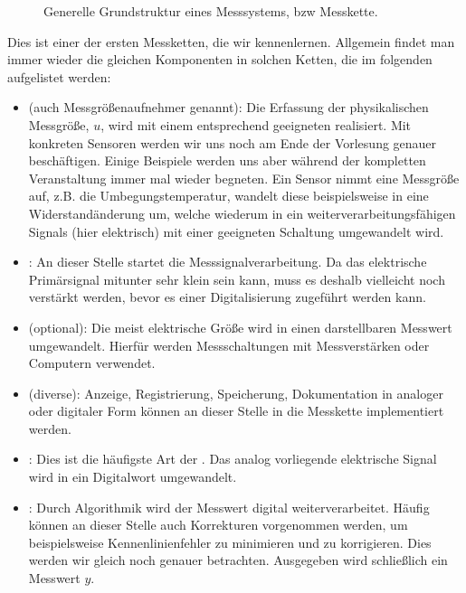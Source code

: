\documentclass[letterpaper,10pt,english]{jupyterBook}
\let\sphinxpxdimen\pdfpxdimen\else\newdimen\sphinxpxdimen
\begin{document}
\begin{figure}[htbp]
\centering
\capstart

\noindent\sphinxincludegraphics[width=800\sphinxpxdimen]{{grundstruktur}.jpg}
\caption{Generelle Grundstruktur eines Messsystems, bzw Messkette.}\label{\detokenize{content/2_Messsystem:grundstruktur}}\end{figure}

\sphinxAtStartPar
Dies ist einer der ersten Messketten, die wir kennenlernen. Allgemein findet man immer wieder die gleichen Komponenten in solchen Ketten, die im folgenden aufgelistet werden:
\begin{itemize}
\item {} 
\sphinxAtStartPar
{} (auch Messgrößenaufnehmer genannt): Die Erfassung der physikalischen Messgröße, \(u\), wird mit einem entsprechend geeigneten  realisiert. Mit konkreten Sensoren werden wir uns noch am Ende der Vorlesung genauer beschäftigen. Einige Beispiele werden uns aber während der kompletten Veranstaltung immer mal wieder begneten. Ein Sensor nimmt eine Messgröße auf, z.B. die Umbegungstemperatur, wandelt diese beispielsweise in eine Widerstandänderung um, welche wiederum in ein weiterverarbeitungsfähigen Signals (hier elektrisch) mit einer geeigneten Schaltung umgewandelt wird.

\item {} 
\sphinxAtStartPar
{}: An dieser Stelle startet die Messsignalverarbeitung. Da das elektrische Primärsignal mitunter sehr  klein sein kann, muss es deshalb vielleicht noch verstärkt werden, bevor es einer Digitalisierung zugeführt werden kann.

\item {} 
\sphinxAtStartPar
{} (optional): Die meist elektrische Größe wird in einen darstellbaren Messwert umgewandelt. Hierfür werden Messschaltungen mit Messverstärken oder Computern verwendet.

\item {} 
\sphinxAtStartPar
{} (diverse): Anzeige, Registrierung, Speicherung, Dokumentation in analoger oder digitaler Form können an dieser Stelle in die Messkette implementiert werden.

\item {} 
\sphinxAtStartPar
{}: Dies ist die häufigste Art der . Das analog vorliegende elektrische Signal wird in ein Digitalwort umgewandelt.

\item {} 
\sphinxAtStartPar
{}: Durch Algorithmik wird der Messwert digital weiterverarbeitet. Häufig können an dieser Stelle auch Korrekturen vorgenommen werden, um beispielsweise Kennenlinienfehler zu minimieren und zu korrigieren. Dies werden wir gleich noch genauer betrachten. Ausgegeben wird schließlich ein Messwert \(y\).

\end{itemize}
\end{document}
